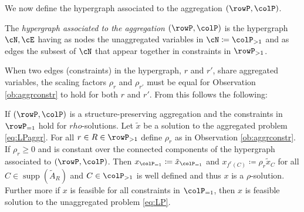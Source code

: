 \documentclass[smallextended,natbib]{svjour3}       %
\DeclareMathOperator{\supp}{supp}
\numberwithin{theorem}{section}
\begin{document}
We now define the hypergraph associated to the aggregation \((\rowP, \colP)\).
\begin{definition}
  The \emph{hypergraph associated to the aggregation \((\rowP, \colP)\)} is the hypergraph \(\cN, \cE\) having as nodes the unaggregated variables in  \(\cN \coloneqq \colP_{>1}\) and as edges the subsest of \(\cN\) that appear together in constraints in \(\rowP_{>1}\).
\end{definition}

When two edges (constraints) in the hypergraph, \(r\) and \(r'\), share aggregated variables, 
the scaling factors \(\rho_r\) and \(\rho_{r'}\) must be equal for Observation \ref{ob:aggrconstr} to hold for both \(r\) and \(r'\). 
From this follows the following:
\begin{proposition}
\label{prop:xaggfeasible}
If \((\rowP, \colP)\) is a structure-preserving aggregation and the constraints in \(\rowP_{=1}\) hold for \(rho\)-solutions. Let \(\tilde{x}\) be a solution 
to the aggregated problem \eqref{eq:LPaggr}. For all \(r \in R \in \rowP_{>1}\) define \(\rho_r\) as in Observation \ref{ob:aggrconstr}. If \(\rho_r \geq 0\) and is constant over the connected components of the hypergraph associated to \((\rowP, \colP)\). 
Then \(x_{\colP_{=1}} \coloneqq \tilde{x}_{\colP_{=1}}\) and \(x_{f^r(C)} \coloneqq \rho_r \tilde{x}_C\) for all \(C \in \supp(\tilde{A}_R)\) and \(C \in \colP_{>1}\) is well defined and thus \(x\) is a \(\rho\)-solution.
Further more if \(x\) is feasible for all constraints in \(\colP_{=1}\), then \(x\) is feasible solution to the unaggregated problem \eqref{eq:LP}.
\end{proposition}
\end{document}
